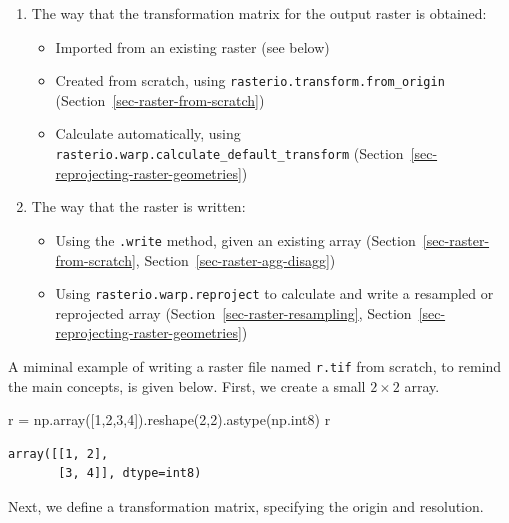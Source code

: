 \documentclass[
  letterpaper,
]{krantz}
\newenvironment{Shaded}{\begin{snugshade}}{\end{snugshade}}
\newcommand{\DecValTok}[1]{\textcolor[rgb]{0.68,0.00,0.00}{#1}}
\newcommand{\NormalTok}[1]{\textcolor[rgb]{0.00,0.23,0.31}{#1}}
\newcommand{\OperatorTok}[1]{\textcolor[rgb]{0.37,0.37,0.37}{#1}}
\providecommand{\tightlist}{%
  \setlength{\itemsep}{0pt}\setlength{\parskip}{0pt}}\usepackage{longtable,booktabs,array}
\begin{document}
\begin{enumerate}
\def\labelenumi{\arabic{enumi}.}
\tightlist
\item
  The way that the transformation matrix for the output raster is
  obtained:

  \begin{itemize}
  \tightlist
  \item
    Imported from an existing raster (see below)
  \item
    Created from scratch, using \texttt{rasterio.transform.from\_origin}
    (Section~\ref{sec-raster-from-scratch})
  \item
    Calculate automatically, using
    \texttt{rasterio.warp.calculate\_default\_transform}
    (Section~\ref{sec-reprojecting-raster-geometries})
  \end{itemize}
\item
  The way that the raster is written:

  \begin{itemize}
  \tightlist
  \item
    Using the \texttt{.write} method, given an existing array
    (Section~\ref{sec-raster-from-scratch},
    Section~\ref{sec-raster-agg-disagg})
  \item
    Using \texttt{rasterio.warp.reproject} to calculate and write a
    resampled or reprojected array (Section~\ref{sec-raster-resampling},
    Section~\ref{sec-reprojecting-raster-geometries})
  \end{itemize}
\end{enumerate}

A miminal example of writing a raster file named \texttt{r.tif} from
scratch, to remind the main concepts, is given below. First, we create a
small \(2 \times 2\) array.

\begin{Shaded}
\begin{Highlighting}[]
\NormalTok{r }\OperatorTok{=}\NormalTok{ np.array([}\DecValTok{1}\NormalTok{,}\DecValTok{2}\NormalTok{,}\DecValTok{3}\NormalTok{,}\DecValTok{4}\NormalTok{]).reshape(}\DecValTok{2}\NormalTok{,}\DecValTok{2}\NormalTok{).astype(np.int8)}
\NormalTok{r}
\end{Highlighting}
\end{Shaded}

\begin{verbatim}
array([[1, 2],
       [3, 4]], dtype=int8)
\end{verbatim}

Next, we define a transformation matrix, specifying the origin and
resolution.
\end{document}
